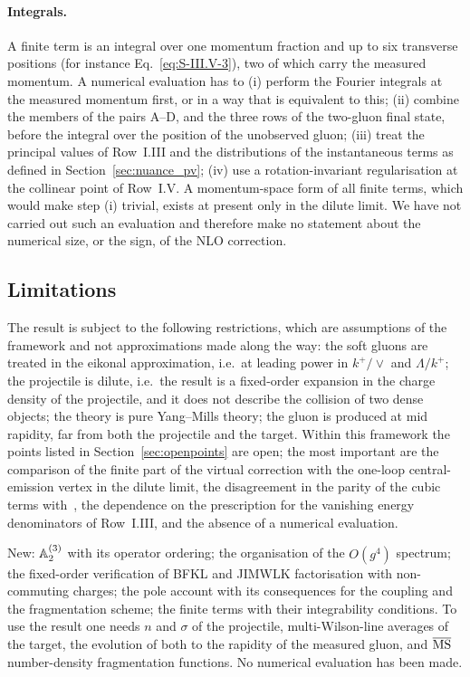 \paragraph{Integrals.} A finite term is an integral over one momentum fraction and up to six transverse positions (for instance Eq.~\eqref{eq:S-III.V-3}), two of which carry the measured momentum. A numerical evaluation has to (i) perform the Fourier integrals at the measured momentum first, or in a way that is equivalent to this; (ii) combine the members of the pairs A--D, and the three rows of the two-gluon final state, before the integral over the position of the unobserved gluon; (iii) treat the principal values of Row~I.III and the distributions of the instantaneous terms as defined in Section~\ref{sec:nuance_pv}; (iv) use a rotation-invariant regularisation at the collinear point of Row~I.V. A momentum-space form of all finite terms, which would make step (i) trivial, exists at present only in the dilute limit. We have not carried out such an evaluation and therefore make no statement about the numerical size, or the sign, of the NLO correction.

\subsection{Limitations}\label{sec:disc_limits}

The result is subject to the following restrictions, which are assumptions of the framework and not approximations made along the way: the soft gluons are treated in the eikonal approximation, i.e.\ at leading power in $k^+/\vee$ and $\Lambda/k^+$; the projectile is dilute, i.e.\ the result is a fixed-order expansion in the charge density of the projectile, and it does not describe the collision of two dense objects; the theory is pure Yang--Mills theory; the gluon is produced at mid rapidity, far from both the projectile and the target. Within this framework the points listed in Section~\ref{sec:openpoints} are open; the most important are the comparison of the finite part of the virtual correction with the one-loop central-emission vertex in the dilute limit, the disagreement in the parity of the cubic terms with~\cite{Li:2021ntm}, the dependence on the prescription for the vanishing energy denominators of Row~I.III, and the absence of a numerical evaluation.

\begin{summarybox}
New: $\mathbb{A}^{(3)}_2$ with its operator ordering; the organisation of the $O(g^4)$ spectrum; the fixed-order verification of BFKL and JIMWLK factorisation with non-commuting charges; the pole account with its consequences for the coupling and the fragmentation scheme; the finite terms with their integrability conditions. To use the result one needs $n$ and $\sigma$ of the projectile, multi-Wilson-line averages of the target, the evolution of both to the rapidity of the measured gluon, and $\overline{\rm MS}$ number-density fragmentation functions. No numerical evaluation has been made.
\end{summarybox}
